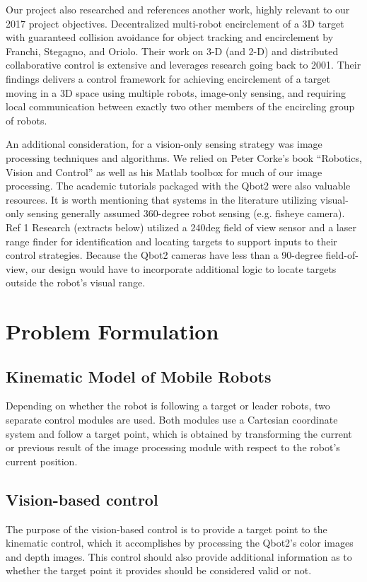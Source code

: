 \documentclass[conference]{IEEEtran}
\begin{document}
Our project also researched and references another work, highly relevant to our 2017 project objectives. Decentralized multi-robot encirclement of a 3D target with guaranteed collision avoidance for object tracking and encirclement by Franchi, Stegagno, and Oriolo\cite{Oriolo}. Their work on 3-D (and 2-D) and distributed collaborative control is extensive and leverages research going back to 2001.   Their findings delivers a control framework for achieving encirclement of a target moving in a 3D space using multiple robots, image-only sensing, and requiring local communication between exactly two other members of the encircling group of robots. 

An additional consideration, for a vision-only sensing strategy was image processing techniques and algorithms.  We relied on Peter Corke’s book “Robotics, Vision and Control” as well as his Matlab toolbox for much of our image processing.  The academic tutorials packaged with the Qbot2 were also valuable resources.  It is worth mentioning that systems in the literature utilizing visual-only sensing generally assumed 360-degree robot sensing (e.g. fisheye camera). Ref 1 Research (extracts below) utilized a 240deg field of view sensor and a laser range finder for identification and locating targets to support inputs to their control strategies.  Because the Qbot2 cameras have less than a 90-degree field-of-view, our design would have to incorporate additional logic to locate targets outside the robot’s visual range.

\section{Problem Formulation}


\subsection{Kinematic Model of Mobile Robots}

Depending on whether the robot is following a target or leader robots, two separate control modules are used. Both modules use a Cartesian coordinate system and follow a target point, which is obtained by transforming the current or previous result of the image processing module with respect to the robot’s current position.

\subsection{Vision-based control}
The purpose of the vision-based control is to provide a target point to the kinematic control, which it accomplishes by processing the Qbot2’s color images and depth images. This control should also provide additional information as to whether the target point it provides should be considered valid or not.
\end{document}
